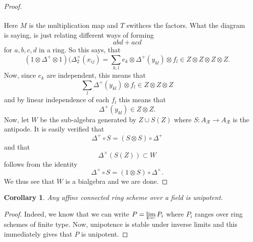 \documentclass[a4paper, 12pt]{amsart}
\numberwithin{equation}{section}
\newtheorem{corollary} [equation]{Corollary}
\theoremstyle{definition}
\begin{document}
\begin{proof}
\\ \\ \noindent
Here $M$ is the multiplication map and $T$ swithces the factors. What the diagram is saying, is just relating different ways of forming $$abd+acd$$ for $a,b,c,d$ in a ring. So this says, that  $$(1 \otimes \Delta^+ \otimes 1)(\Delta^{\times}_2(x_{ij}) = \sum_{k,l} e_k \otimes \Delta^+(y_{kl}) \otimes f_l  \in Z \otimes Z \otimes Z \otimes Z.$$
Now, since $e_k$ are independent, this means that $$\sum_l
\Delta^+(y_{kl}) \otimes f_l \in Z \otimes Z \otimes Z$$ and by linear independence
of each $f_l$ this means that $$\Delta^+(y_{kl}) \in Z \otimes Z.$$ Now, let $W$ be
the sub-algebra generated by $Z \cup S(Z)$ where $S:A_\mathcal{R} \rightarrow A_\mathcal{R}$ is
the antipode. It is easily verified that $$\Delta^+ \circ S = (S \otimes
S ) \circ \Delta^+$$ and that $$\Delta^{\times}(S(Z)) \subset W$$ 
follows from the identity $$\Delta^{\times} \circ S = (1
\otimes S) \circ \Delta^{\times}.$$ We thus see that $W$ is a bialgebra
and we are done. \end{proof}
\begin{corollary}
Any affine connected ring scheme over a field is unipotent.
\end{corollary}
\begin{proof}
Indeed, we know that we can write $P = \varprojlim P_i $ where $P_i$ ranges over ring schemes of finite type. Now, unipotence is stable under inverse limits and this immediately gives that $P$ is unipotent. 
\end{proof}
\end{document}
